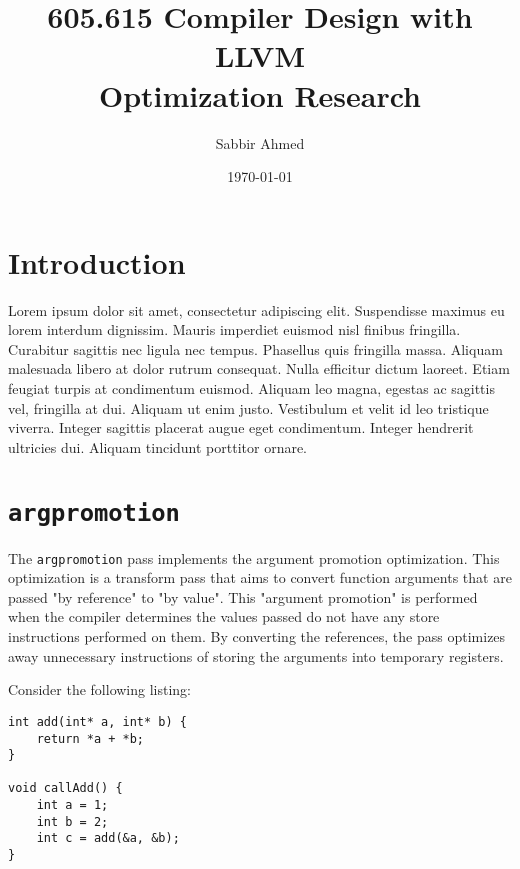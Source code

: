 \documentclass[titlepage]{article}
\title{605.615 Compiler Design with LLVM \\ Optimization Research}
\author{Sabbir Ahmed}
\date{\today}
\begin{document}
\maketitle


\section{Introduction} Lorem ipsum dolor sit amet, consectetur adipiscing elit. Suspendisse maximus eu lorem interdum dignissim. Mauris imperdiet euismod nisl finibus fringilla. Curabitur sagittis nec ligula nec tempus. Phasellus quis fringilla massa. Aliquam malesuada libero at dolor rutrum consequat. Nulla efficitur dictum laoreet. Etiam feugiat turpis at condimentum euismod. Aliquam leo magna, egestas ac sagittis vel, fringilla at dui. Aliquam ut enim justo. Vestibulum et velit id leo tristique viverra. Integer sagittis placerat augue eget condimentum. Integer hendrerit ultricies dui. Aliquam tincidunt porttitor ornare. \cite{passes}

\section{\texttt{argpromotion}} The \texttt{argpromotion} pass implements the argument promotion optimization. This optimization is a transform pass that aims to convert function arguments that are passed "by reference" to "by value". \cite{argpromotion-src} This "argument promotion" is performed when the compiler determines the values passed do not have any store instructions performed on them. By converting the references, the pass optimizes away unnecessary instructions of storing the arguments into temporary registers.

Consider the following listing:

\begin{lstlisting}[caption=A method to return the sum of 2 integers,style=customC++]
int add(int* a, int* b) {
    return *a + *b;
}

void callAdd() {
    int a = 1;
    int b = 2;
    int c = add(&a, &b);
}
\end{lstlisting}
\end{document}
